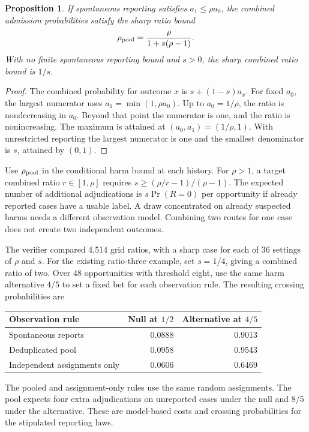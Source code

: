 \documentclass[11pt]{article}
\newtheorem{proposition}{Proposition}
\begin{document}
\begin{proposition}
If spontaneous reporting satisfies $a_1\le\rho a_0$, the
combined admission probabilities satisfy the sharp ratio bound
\[
\rho_{\rm pool}=\frac{\rho}{1+s(\rho-1)}.
\]
With no finite spontaneous reporting bound and $s>0$, the
sharp combined ratio bound is $1/s$.
\end{proposition}
\begin{proof}
The combined probability for outcome $x$ is $s+(1-s)a_x$.
For fixed $a_0$, the largest numerator uses
$a_1=\min(1,\rho a_0)$. Up to $a_0=1/\rho$, the ratio is
nondecreasing in $a_0$. Beyond that point the numerator is one,
and the ratio is nonincreasing. The maximum is attained at
$(a_0,a_1)=(1/\rho,1)$. With unrestricted reporting the
largest numerator is one and the smallest denominator is $s$,
attained by $(0,1)$.
\end{proof}

Use $\rho_{\rm pool}$ in the conditional harm bound at each
history. For $\rho>1$, a target combined ratio $r\in[1,\rho]$
requires $s\ge(\rho/r-1)/(\rho-1)$. The expected number
of additional adjudications is $s\Pr(R=0)$ per opportunity if
already reported cases have a usable label. A draw concentrated
on already suspected harms needs a different observation model.
Combining two routes for one case does not create two independent
outcomes.

The verifier compared 4,514 grid ratios, with a sharp case
for each of 36 settings of $\rho$ and $s$. For the existing
ratio-three example, set $s=1/4$, giving a combined ratio of
two. Over 48 opportunities with threshold eight, use the same
harm alternative $4/5$ to set a fixed bet for each observation
rule. The resulting crossing probabilities are
\begin{center}
\begin{tabular}{lrr}
\toprule
Observation rule & Null at $1/2$ & Alternative at $4/5$ \\
\midrule
Spontaneous reports & 0.0888 & 0.9013 \\
Deduplicated pool & 0.0958 & 0.9543 \\
Independent assignments only & 0.0606 & 0.6469 \\
\bottomrule
\end{tabular}
\end{center}
The pooled and assignment-only rules use the same random
assignments. The pool expects four extra adjudications on
unreported cases under the null and $8/5$ under the alternative.
These are model-based costs and crossing probabilities for
the stipulated reporting laws.
\end{document}

